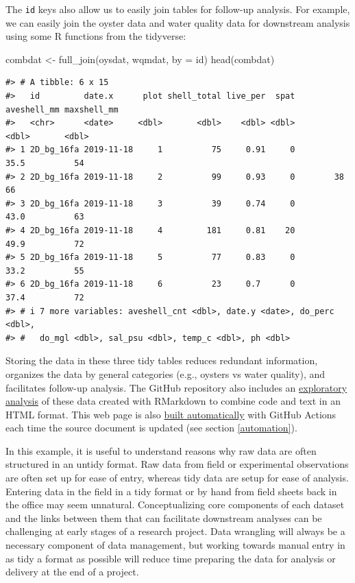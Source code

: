 \documentclass[
]{book}
\newenvironment{Shaded}{\begin{snugshade}}{\end{snugshade}}
\newcommand{\AttributeTok}[1]{\textcolor[rgb]{0.77,0.63,0.00}{#1}}
\newcommand{\FunctionTok}[1]{\textcolor[rgb]{0.00,0.00,0.00}{#1}}
\newcommand{\NormalTok}[1]{#1}
\newcommand{\OtherTok}[1]{\textcolor[rgb]{0.56,0.35,0.01}{#1}}
\newcommand{\StringTok}[1]{\textcolor[rgb]{0.31,0.60,0.02}{#1}}
\begin{document}
The \texttt{id} keys also allow us to easily join tables for follow-up analysis. For example, we can easily join the oyster data and water quality data for downstream analysis using some R functions from the tidyverse:

\begin{Shaded}
\begin{Highlighting}[]
\NormalTok{combdat }\OtherTok{\textless{}{-}} \FunctionTok{full\_join}\NormalTok{(oysdat, wqmdat, }\AttributeTok{by =} \StringTok{\textquotesingle{}id\textquotesingle{}}\NormalTok{)}
\FunctionTok{head}\NormalTok{(combdat)}
\end{Highlighting}
\end{Shaded}

\begin{verbatim}
#> # A tibble: 6 x 15
#>   id         date.x      plot shell_total live_per  spat aveshell_mm maxshell_mm
#>   <chr>      <date>     <dbl>       <dbl>    <dbl> <dbl>       <dbl>       <dbl>
#> 1 2D_bg_16fa 2019-11-18     1          75     0.91     0        35.5          54
#> 2 2D_bg_16fa 2019-11-18     2          99     0.93     0        38            66
#> 3 2D_bg_16fa 2019-11-18     3          39     0.74     0        43.0          63
#> 4 2D_bg_16fa 2019-11-18     4         181     0.81    20        49.9          72
#> 5 2D_bg_16fa 2019-11-18     5          77     0.83     0        33.2          55
#> 6 2D_bg_16fa 2019-11-18     6          23     0.7      0        37.4          72
#> # i 7 more variables: aveshell_cnt <dbl>, date.y <date>, do_perc <dbl>,
#> #   do_mgl <dbl>, sal_psu <dbl>, temp_c <dbl>, ph <dbl>
\end{verbatim}

Storing the data in these three tidy tables reduces redundant information, organizes the data by general categories (e.g., oysters vs water quality), and facilitates follow-up analysis. The GitHub repository also includes an \href{https://tbep-tech.github.io/tberf-oyster/figures.html}{exploratory analysis} of these data created with RMarkdown \citep{Xie18} to combine code and text in an HTML format. This web page is also \href{https://github.com/tbep-tech/tberf-oyster/actions}{built automatically} with GitHub Actions each time the source document is updated (see section \ref{automation}).

In this example, it is useful to understand reasons why raw data are often structured in an untidy format. Raw data from field or experimental observations are often set up for ease of entry, whereas tidy data are setup for ease of analysis. Entering data in the field in a tidy format or by hand from field sheets back in the office may seem unnatural. Conceptualizing core components of each dataset and the links between them that can facilitate downstream analyses can be challenging at early stages of a research project. Data wrangling will always be a necessary component of data management, but working towards manual entry in as tidy a format as possible will reduce time preparing the data for analysis or delivery at the end of a project.
\end{document}
